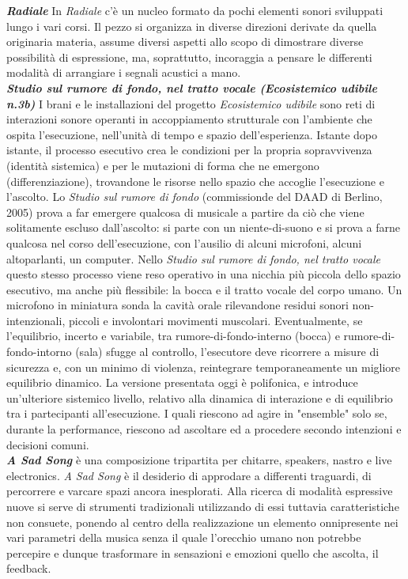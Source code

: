 \documentclass[9pt, twoside, a5paper]{extreport}
\newcommand{\descrizione}[2]{%
\noindent \textbf{\textit{#1}} %
#2 %
\\
}%
\begin{document}
\begin{multicols}{2}

\descrizione{Radiale}{In \textit{Radiale} c'è un nucleo formato da pochi elementi sonori sviluppati lungo i vari corsi. Il pezzo si organizza in diverse direzioni derivate da quella originaria materia, assume diversi aspetti allo scopo di dimostrare diverse possibilità di espressione, ma, soprattutto, incoraggia a pensare le differenti modalità di arrangiare i segnali acustici a mano.}


\descrizione{Studio sul rumore di fondo, nel tratto vocale (Ecosistemico udibile n.3b)}{I brani e le installazioni del progetto \textit{Ecosistemico udibile} sono reti di interazioni sonore operanti in accoppiamento strutturale con l'ambiente che ospita l’esecuzione, nell’unità di tempo e spazio dell’esperienza. Istante dopo istante, il processo esecutivo crea le condizioni per la propria sopravvivenza (identità sistemica) e per le mutazioni di forma che ne emergono (differenziazione), trovandone le risorse nello spazio che accoglie l'esecuzione e l'ascolto. Lo \textit{Studio sul rumore di fondo} (commissionde del DAAD di Berlino, 2005) prova a far emergere qualcosa di musicale a partire da ciò che viene solitamente escluso dall'ascolto: si parte con un niente-di-suono e si prova a farne qualcosa nel corso dell’esecuzione, con l’ausilio di alcuni microfoni, alcuni altoparlanti, un computer. Nello \textit{Studio sul rumore di fondo, nel tratto vocale} questo stesso processo viene reso operativo in una nicchia più piccola dello spazio esecutivo, ma anche più flessibile: la bocca e il tratto vocale del corpo umano. Un microfono in miniatura sonda la cavità orale rilevandone residui sonori non-intenzionali, piccoli e involontari movimenti muscolari. Eventualmente, se l’equilibrio, incerto e variabile, tra rumore-di-fondo-interno (bocca) e rumore-di-fondo-intorno (sala) sfugge al controllo, l'esecutore deve ricorrere a misure di sicurezza e, con un minimo di violenza, reintegrare temporaneamente un migliore equilibrio dinamico. La versione presentata oggi è polifonica, e introduce un’ulteriore sistemico livello, relativo alla dinamica di interazione e di equilibrio tra i partecipanti all’esecuzione. I quali riescono ad agire in "ensemble" solo se, durante la performance, riescono ad ascoltare ed a procedere secondo intenzioni e decisioni comuni. }


\descrizione{A Sad Song}{è una composizione tripartita per chitarre, speakers, nastro e live electronics.
\textit{A Sad Song} è il desiderio di approdare a differenti traguardi, di percorrere e varcare spazi ancora inesplorati. Alla ricerca di modalità espressive nuove si serve di strumenti tradizionali utilizzando di essi tuttavia caratteristiche non consuete, ponendo al centro della realizzazione un elemento onnipresente nei vari parametri della musica senza il quale l'orecchio umano non potrebbe percepire e dunque trasformare in sensazioni e emozioni quello che ascolta, il feedback.}



\end{multicols}
\end{document}
